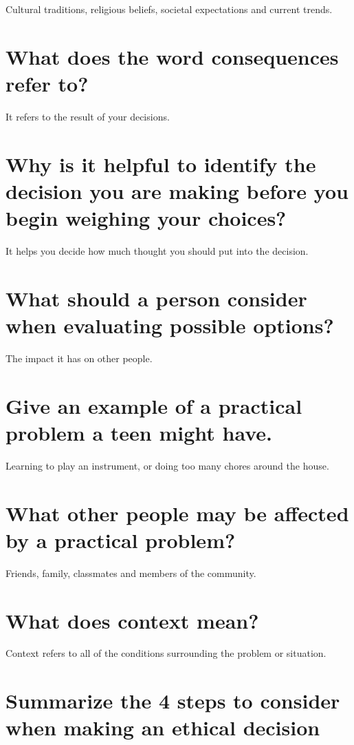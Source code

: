 \documentclass[11pt]{article}
\begin{document}
Cultural traditions, religious beliefs, societal expectations and current trends.

\section*{What does the word consequences refer to?}
\label{sec:org9c958e2}

It refers to the result of your decisions.

\section*{Why is it helpful to identify the decision you are making before you begin weighing your choices?}
\label{sec:org45b9bf1}

It helps you decide how much thought you should put into the decision.

\section*{What should a person consider when evaluating possible options?}
\label{sec:org9a0d1f8}

The impact it has on other people.

\section*{Give an example of a practical problem a teen might have.}
\label{sec:orge421292}

Learning to play an instrument, or doing too many chores around the house.

\section*{What other people may be affected by a practical problem?}
\label{sec:org670e23a}

Friends, family, classmates and members of the community.

\section*{What does context mean?}
\label{sec:orgad6a7a9}

Context refers to all of the conditions surrounding the problem or situation. 

\section*{Summarize the 4 steps to consider when making an ethical decision}
\label{sec:orged20707}
\end{document}
